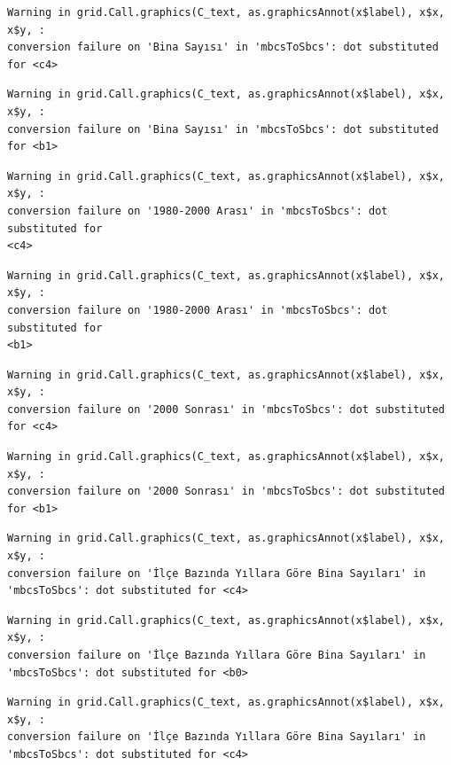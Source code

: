 \documentclass[
  11pt,
  a4paper,
  DIV=11,
  numbers=noendperiod]{scrartcl}
\begin{document}
\begin{verbatim}
Warning in grid.Call.graphics(C_text, as.graphicsAnnot(x$label), x$x, x$y, :
conversion failure on 'Bina Sayısı' in 'mbcsToSbcs': dot substituted for <c4>
\end{verbatim}

\begin{verbatim}
Warning in grid.Call.graphics(C_text, as.graphicsAnnot(x$label), x$x, x$y, :
conversion failure on 'Bina Sayısı' in 'mbcsToSbcs': dot substituted for <b1>
\end{verbatim}

\begin{verbatim}
Warning in grid.Call.graphics(C_text, as.graphicsAnnot(x$label), x$x, x$y, :
conversion failure on '1980-2000 Arası' in 'mbcsToSbcs': dot substituted for
<c4>
\end{verbatim}

\begin{verbatim}
Warning in grid.Call.graphics(C_text, as.graphicsAnnot(x$label), x$x, x$y, :
conversion failure on '1980-2000 Arası' in 'mbcsToSbcs': dot substituted for
<b1>
\end{verbatim}

\begin{verbatim}
Warning in grid.Call.graphics(C_text, as.graphicsAnnot(x$label), x$x, x$y, :
conversion failure on '2000 Sonrası' in 'mbcsToSbcs': dot substituted for <c4>
\end{verbatim}

\begin{verbatim}
Warning in grid.Call.graphics(C_text, as.graphicsAnnot(x$label), x$x, x$y, :
conversion failure on '2000 Sonrası' in 'mbcsToSbcs': dot substituted for <b1>
\end{verbatim}

\begin{verbatim}
Warning in grid.Call.graphics(C_text, as.graphicsAnnot(x$label), x$x, x$y, :
conversion failure on 'İlçe Bazında Yıllara Göre Bina Sayıları' in
'mbcsToSbcs': dot substituted for <c4>
\end{verbatim}

\begin{verbatim}
Warning in grid.Call.graphics(C_text, as.graphicsAnnot(x$label), x$x, x$y, :
conversion failure on 'İlçe Bazında Yıllara Göre Bina Sayıları' in
'mbcsToSbcs': dot substituted for <b0>
\end{verbatim}

\begin{verbatim}
Warning in grid.Call.graphics(C_text, as.graphicsAnnot(x$label), x$x, x$y, :
conversion failure on 'İlçe Bazında Yıllara Göre Bina Sayıları' in
'mbcsToSbcs': dot substituted for <c4>
\end{verbatim}
\end{document}
